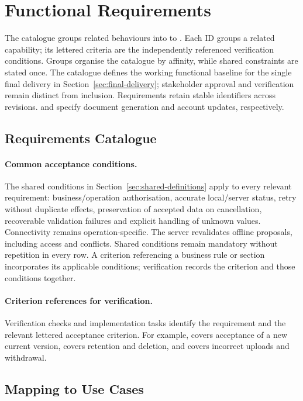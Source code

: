 \section{Functional Requirements}
\label{sec:functional-requirements}
The catalogue groups related behaviours into  to .
Each ID groups a related capability; its lettered criteria are the independently
referenced verification conditions. Groups organise the catalogue by affinity,
while shared constraints are stated once.
The catalogue defines the working functional baseline for the single final
delivery in Section~\ref{sec:final-delivery}; stakeholder approval and verification
remain distinct from inclusion.
Requirements retain stable identifiers across revisions.  and 
specify document generation and account updates, respectively.
\subsection{Requirements Catalogue}
\label{sec:requirements-catalogue}
\paragraph{Common acceptance conditions.}
The shared conditions in Section~\ref{sec:shared-definitions} apply to
every relevant requirement: business/operation authorisation, accurate
local/server status, retry without duplicate effects, preservation of
accepted data on cancellation, recoverable validation failures and
explicit handling of unknown values. Connectivity remains operation-specific.
The server revalidates offline proposals, including access and conflicts.
Shared conditions remain mandatory without repetition in every row.
A criterion referencing a business rule or section incorporates its applicable
conditions; verification records the criterion and those conditions together.
\paragraph{Criterion references for verification.}
Verification checks and implementation tasks identify the requirement and
the relevant lettered acceptance criterion. For example,  covers
acceptance of a new current version,  covers retention and deletion,
and  covers incorrect uploads and withdrawal.






\subsection{Mapping to Use Cases}
\label{sec:requirements-mapping}

